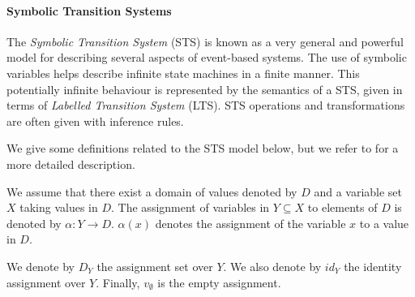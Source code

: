\paragraph{Symbolic Transition Systems}
\label{sec:definitions:sts}

The \textit{Symbolic Transition System} (STS) is known as a very
general and powerful model for describing several aspects of
event-based systems. The use of symbolic variables
helps describe infinite state machines in a finite manner. This
potentially infinite behaviour is represented by the semantics of
a STS, given in terms of \textit{Labelled Transition System}
(LTS). STS operations and transformations are often given with
inference rules.

We give some definitions related to the STS model below, but we
refer to \cite{FTW05} for a more detailed description.

\begin{definition}
We assume that there exist a domain of values denoted by $D$ and
a variable set $X$ taking values in $D$. The assignment of
variables in $Y \subseteq X$ to elements of $D$ is denoted by
$\alpha: Y \rightarrow D$. $\alpha(x)$ denotes the assignment of
the variable $x$ to a value in $D$.

We denote by $D_Y$ the assignment set over $Y$. We also denote by
$id_Y$ the identity assignment over $Y$. Finally, $v_\emptyset$
is the empty assignment.
\end{definition}

